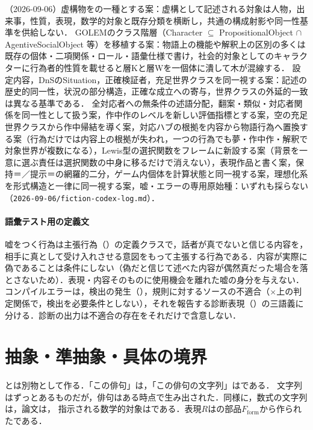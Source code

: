 \documentclass[../../main-detail.tex]{subfiles}
\begin{document}
\begin{whynot}
（2026-09-06）虚構物をの一種とする案：虚構として記述される対象は人物，出来事，性質，表現，数学的対象と既存分類を横断し，共通の構成射影や同一性基準を供給しない．
GOLEMのクラス階層（Character $\subseteq$ PropositionalObject $\cap$ AgentiveSocialObject 等）を移植する案：物語上の機能や解釈上の区別の多くは既存の個体・二項関係・ロール・語彙仕様で書け，社会的対象としてのキャラクターに行為者的性質を載せると層Kと層Wを一個体に潰して木が混線する．
設定内容，DnSのSituation，正確検証者，充足世界クラスを同一視する案：記述の歴史的同一性，状況の部分構造，正確な成立への寄与，世界クラスの外延的一致は異なる基準である．
全対応者への無条件の述語分配，翻案・類似・対応者関係を同一性として扱う案，作中作のレベルを新しい評価指標とする案，空の充足世界クラスから作中帰結を導く案，対応ハブの根拠を内容から物語行為へ置換する案（行為だけでは内容上の根拠が失われ，一つの行為でも夢・作中作・解釈で対象世界が複数になる），Lewis型の選択関数をフレームに新設する案（背景を一意に選ぶ責任は選択関数の中身に移るだけで消えない），表現作品と書く案，保持＝／提示＝の網羅的二分，ゲーム内個体を計算状態と同一視する案，理想化系を形式構造と一律に同一視する案，嘘・エラーの専用原始種：いずれも採らない（\texttt{2026-09-06/fiction-codex-log.md}）．
\end{whynot}

\paragraph{語彙テスト用の定義文} 嘘をつく行為は主張行為（）の定義クラスで，話者が真でないと信じる内容を，相手に真として受け入れさせる意図をもって主張する行為である．内容が実際に偽であることは条件にしない（偽だと信じて述べた内容が偶然真だった場合を落とさないため）．表現・内容そのものに使用機会を離れた嘘の身分を与えない．コンパイルエラーは，検出の発生（），規則に対するソースの不適合（$\times$上の判定関係で，検出を必要条件としない），それを報告する診断表現（）の三語義に分ける．診断の出力は不適合の存在をそれだけで含意しない．

\section{抽象・準抽象・具体の境界}
とは別物として作る．「この俳句」は，「この俳句の文字列」はである．
文字列はずっとあるものだが，俳句はある時点で生み出された．同様に，数式の文字列は，論文は，
指示される数学的対象はである．表現$R$はの部品$F_{\mathrm{form}}$から作られたである．
\end{document}
